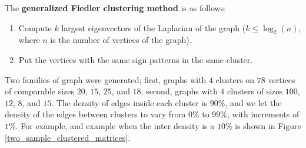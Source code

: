 \documentclass{amsart}
\begin{document}
	The \textbf{generalized Fiedler clustering method} is as follows:
	\begin{enumerate}
		\item Compute $k$ largest eigenvectors of the Laplacian of the graph ($k \leq \log_2(n)$, where $n$ is the number of vertices of the graph).
		\item Put the vertices with the same sign patterns in the same cluster.
	\end{enumerate}
	
	Two families of graph were generated; first, graphs with $4$ clusters on $78$ vertices of comparable sizes $20$, $15$, $25$, and $18$; second, graphs with $4$ clusters of sizes $100$, $12$, $8$, and $15$. The density of edges inside each cluster is $90\%$, and we let the density of the edges between clusters to vary from $0\%$ to $99\%$, with increments of $1\%$. For example, and example when the inter density is a $10\%$ is shown in Figure \ref{two_sample_clustered_matrices}.
		
\end{document}
